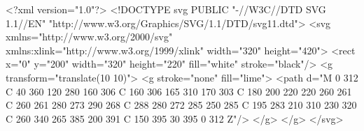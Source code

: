 <?xml version="1.0"?>
<!DOCTYPE svg PUBLIC "-//W3C//DTD SVG 1.1//EN" 
"http://www.w3.org/Graphics/SVG/1.1/DTD/svg11.dtd">
<svg xmlns="http://www.w3.org/2000/svg" 
     xmlns:xlink="http://www.w3.org/1999/xlink"
     width="320" height="420">
  <rect x="0" y="200" width="320" height="220" fill="white" stroke="black"/>
    <g transform="translate(10 10)">
      <g stroke="none" fill="lime">
        <path d="M 0 312
 C 40 360 120 280 160 306 C 160 306 165 310 170 303
 C 180 200 220 220 260 261 C 260 261 280 273 290 268
 C 288 280 272 285 250 285 C 195 283 210 310 230 320
 C 260 340 265 385 200 391 C 150 395 30 395 0 312 Z"/>
            </g> </g>
</svg>
